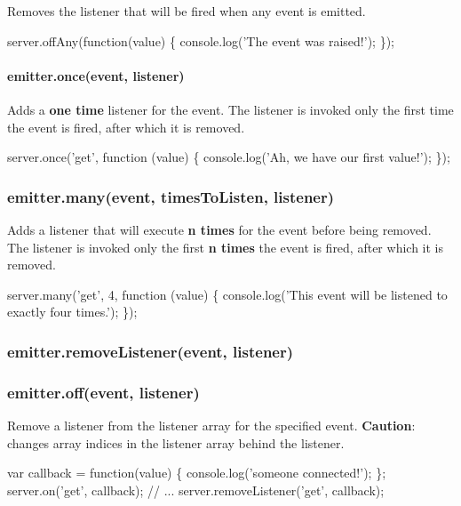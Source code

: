 Removes the listener that will be fired when any event is emitted.


\begin{DoxyCode}
server.offAny(function(value) \{
  console.log('The event was raised!');
\});
\end{DoxyCode}


\paragraph*{emitter.\+once(event, listener)}

Adds a {\bfseries one time} listener for the event. The listener is invoked only the first time the event is fired, after which it is removed.


\begin{DoxyCode}
server.once('get', function (value) \{
  console.log('Ah, we have our first value!');
\});
\end{DoxyCode}


\subsubsection*{emitter.\+many(event, times\+To\+Listen, listener)}

Adds a listener that will execute {\bfseries n times} for the event before being removed. The listener is invoked only the first {\bfseries n times} the event is fired, after which it is removed.


\begin{DoxyCode}
server.many('get', 4, function (value) \{
  console.log('This event will be listened to exactly four times.');
\});
\end{DoxyCode}


\subsubsection*{emitter.\+remove\+Listener(event, listener)}

\subsubsection*{emitter.\+off(event, listener)}

Remove a listener from the listener array for the specified event. {\bfseries Caution}\+: changes array indices in the listener array behind the listener.


\begin{DoxyCode}
var callback = function(value) \{
  console.log('someone connected!');
\};
server.on('get', callback);
// ...
server.removeListener('get', callback);
\end{DoxyCode}


